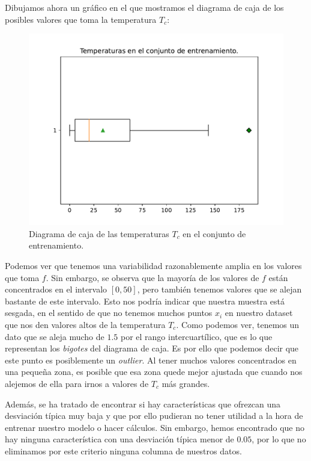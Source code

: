 \documentclass[a4paper, 20pt]{article}
\begin{document}
Dibujamos ahora un gráfico en el que mostramos el diagrama de caja de los posibles valores que toma la temperatura $T_c$:

\begin{figure}[H]
  \centering
  \includegraphics[scale = 0.4]{boxplot_y.pdf}
  \caption{Diagrama de caja de las temperaturas $T_c$ en el conjunto de entrenamiento.}
  \label{fig:box-plot}
\end{figure}

Podemos ver que tenemos una variabilidad razonablemente amplia en los valores que toma $f$. Sin embargo, se observa que la mayoría de los valores de $f$ están concentrados en el intervalo $[0,50]$, pero también tenemos valores que se alejan bastante de este intervalo. Esto nos podría indicar que nuestra muestra está sesgada, en el sentido de que no tenemos muchos puntos $x_i$ en nuestro dataset que nos den valores altos de la temperatura $T_c$.  Como podemos ver, tenemos un dato que se aleja mucho de $1.5$ por el rango intercuartílico, que es lo que representan los \emph{bigotes} del diagrama de caja. Es por ello que podemos decir que este punto es posiblemente un \emph{outlier}. Al tener muchos valores concentrados en una pequeña zona, es posible que esa zona quede mejor ajustada que cuando nos alejemos de ella para irnos a valores de $T_c$ más grandes.

Además, se ha tratado de encontrar si hay características que ofrezcan una desviación típica muy baja y que por ello pudieran no tener utilidad a la hora de entrenar nuestro modelo o hacer cálculos. Sin embargo, hemos encontrado que no hay ninguna característica con una desviación típica menor de $0.05$, por lo que no eliminamos por este criterio ninguna columna de nuestros datos.
\end{document}
